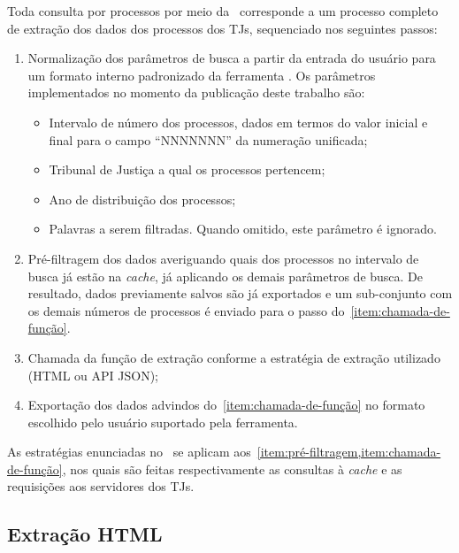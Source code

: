 Toda consulta por processos por meio da \tjscraper~corresponde a um processo
completo de extração dos dados dos processos dos TJs, sequenciado nos seguintes
passos:

\begin{enumerate}
    \item Normalização dos parâmetros de busca a partir da entrada do usuário
        para um formato interno padronizado da ferramenta \tjscraper. Os
        parâmetros implementados no momento da publicação deste trabalho são:

        \begin{itemize}
            \item Intervalo de número dos processos, dados em termos do valor
                inicial e final para o campo ``NNNNNNN'' da numeração
                unificada;
            \item Tribunal de Justiça a qual os processos pertencem;
            \item Ano de distribuição dos processos;
            \item Palavras a serem filtradas. Quando omitido, este parâmetro é
                ignorado.
        \end{itemize}
    \item \label{item:pré-filtragem} Pré-filtragem dos dados averiguando quais
        dos processos no intervalo de busca já estão na \textit{cache}, já
        aplicando os demais parâmetros de busca. De resultado, dados
        previamente salvos são já exportados e um sub-conjunto com os demais
        números de processos é enviado para o passo
        do~\cref{item:chamada-de-função}.
    \item \label{item:chamada-de-função} Chamada da função de extração conforme
        a estratégia de extração utilizado (HTML ou API JSON);
    \item Exportação dos dados advindos do~\cref{item:chamada-de-função} no
        formato escolhido pelo usuário suportado pela ferramenta.
\end{enumerate}

As estratégias enunciadas no~ se aplicam
aos~\cref{item:pré-filtragem,item:chamada-de-função}, nos quais são feitas
respectivamente as consultas à \textit{cache} e as requisições aos servidores
dos TJs.

\subsection{Extração HTML}

